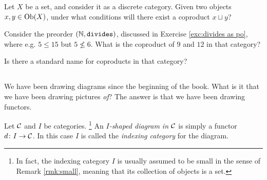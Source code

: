 \documentclass[CT4S-EN-RU]{subfiles}
\begin{document}
\begin{exerciseRUS}
\end{exerciseRUS}

\begin{exerciseENG}
Let $X$ be a set, and consider it as a discrete category. Given two objects $x,y\in\textnormal{Ob}(X)$, under what conditions will there exist a coproduct $x\sqcup y$?
\end{exerciseENG}

\begin{exerciseRUS}
\end{exerciseRUS}

\begin{exerciseENG}
Consider the preorder $({\mathbb N},{\tt divides})$, discussed in Exercise \ref{exc:divides as po}, where e.g. $5\leq 15$ but $5\not\leq 6$. \sexc What is the coproduct of $9$ and $12$ in that category?
\item Is there a standard name for coproducts in that category?
\endsexc
\end{exerciseENG}

\begin{exerciseRUS}
\end{exerciseRUS}


\subsection{}\label{sec:diagrams in a category}

\begin{blockENG}
We have been drawing diagrams since the beginning of the book. What is it that we have been drawing pictures {\em of}? The answer is that we have been drawing functors.
\end{blockENG}

\begin{blockRUS}
\end{blockRUS}

\begin{definitionENG}
Let $\mathcal{C}$ and $I$ be categories.
\footnote{In fact, the indexing category $I$ is usually assumed to be small in the sense of Remark \ref{rmk:small}, meaning that its collection of objects is a set.}
An {\em $I$-shaped diagram in $\mathcal{C}$} is simply a functor $d\colon I\rightarrow\mathcal{C}$. In this case $I$ is called the {\em indexing category} for the diagram.
\end{definitionENG}
\end{document}

